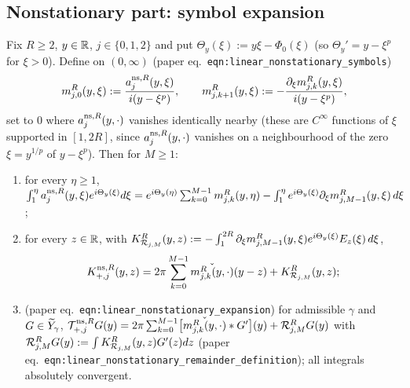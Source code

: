 \subsection{Nonstationary part: symbol expansion}

\begin{lemma}
  \label{lem:linear_nonstationary_symbol_expansion}
  Fix $R\ge2$, $y\in\mathbb{R}$, $j\in\{0,1,2\}$ and put $\Theta_y(\xi):=y\xi-\Phi_0(\xi)$ (so $\Theta_y'=y-\xi^p$ for $\xi>0$). Define on $(0,\infty)$
  (paper eq.~\texttt{eqn:linear\_nonstationary\_symbols})
  \[
    m_{j,0}^R(y,\xi):=\frac{a_j^{\textup{ns},R}(y,\xi)}{i(y-\xi^p)},\qquad m_{j,k+1}^R(y,\xi):=-\frac{\partial_\xi m_{j,k}^R(y,\xi)}{i(y-\xi^p)},
  \]
  set to $0$ where $a_j^{\textup{ns},R}(y,\cdot)$ vanishes identically nearby (these are $C^\infty$ functions of $\xi$ supported in $[1,2R]$, since
  $a_j^{\textup{ns},R}(y,\cdot)$ vanishes on a neighbourhood of the zero $\xi=y^{1/p}$ of $y-\xi^p$). Then for $M\ge1$:
  \begin{enumerate}
    \item for every $\eta\ge1$, $\int_1^\eta a_j^{\textup{ns},R}(y,\xi)e^{i\Theta_y(\xi)}d\xi=e^{i\Theta_y(\eta)}\sum_{k=0}^{M-1}m_{j,k}^R(y,\eta)-\int_1^\eta e^{i\Theta_y(\xi)}\partial_\xi m_{j,M-1}^R(y,\xi)\,d\xi$;
    \item for every $z\in\mathbb{R}$, with $K_{\mathcal{R}_{j,M}}^R(y,z):=-\int_1^{2R}\partial_\xi m^R_{j,M-1}(y,\xi)e^{i\Theta_y(\xi)}E_z(\xi)\,d\xi$,
      \[
        K_{+,j}^{\textup{ns},R}(y,z)=2\pi\sum_{k=0}^{M-1}\check{m_{j,k}^R(y,\cdot)}(y-z)+K_{\mathcal{R}_{j,M}}^R(y,z);
      \]
    \item (paper eq.~\texttt{eqn:linear\_nonstationary\_expansion}) for admissible $\gamma$ and $G\in\widetilde{Y}_\gamma$,
      $\mathcal{T}_{+,j}^{\textup{ns},R}G(y)=2\pi\sum_{k=0}^{M-1}\bigl[\check{m_{j,k}^R(y,\cdot)}*G'\bigr](y)+\mathcal{R}_{j,M}^RG(y)$ with
      $\mathcal{R}^R_{j,M}G(y):=\int K^R_{\mathcal{R}_{j,M}}(y,z)G'(z)dz$ (paper eq.~\texttt{eqn:linear\_nonstationary\_remainder\_definition}); all integrals absolutely convergent.
  \end{enumerate}
\end{lemma}
